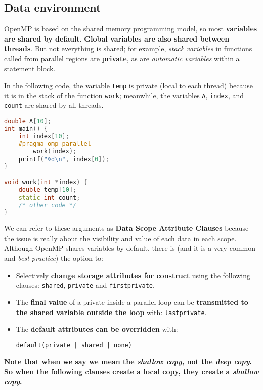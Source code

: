 \subsection{Data environment}\label{subsection: Data environment}

OpenMP is based on the shared memory programming model, so most \textbf{variables are shared by default}. \textbf{Global variables are also shared between threads}. But not everything is shared; for example, \emph{stack variables} in functions called from parallel regions are \textbf{private}, as are \emph{automatic variables} within a statement block.

\begin{examplebox}
    In the following code, the variable \texttt{temp} is private (local to each thread) because it is in the stack of the function \texttt{work}; meanwhile, the variables \texttt{A}, \texttt{index}, and \texttt{count} are shared by all threads.
    \begin{lstlisting}[language=C++]
double A[10];
int main() {
    int index[10];
    #pragma omp parallel
        work(index);
    printf("%d\n", index[0]);
}

void work(int *index) {
    double temp[10];
    static int count;
    /* other code */
}\end{lstlisting}
\end{examplebox}

\noindent
We can refer to these arguments as \textbf{Data Scope Attribute Clauses} because the issue is really about the visibility and value of each data in each scope. Although OpenMP shares variables by default, there is (and it is a very common and \emph{best practice}) the option to:
\begin{itemize}
    \item Selectively \textbf{change storage attributes for construct} using the following clauses: \texttt{shared}, \texttt{private} and \texttt{firstprivate}.
    \item The \textbf{final value} of a private inside a parallel loop can be \textbf{transmitted to the shared variable outside the loop} with: \texttt{lastprivate}.
    \item The \textbf{default attributes can be overridden} with:
    \vspace{-.8em}
    \begin{center}
        \texttt{default(private | shared | none)}
    \end{center}
    \vspace{-.8em}
\end{itemize}
\textcolor{Red2}{ \textbf{Note that when we say  we mean the \emph{shallow copy}, not the \emph{deep copy}. So when the following clauses create a local copy, they create a \emph{shallow copy}.}}

